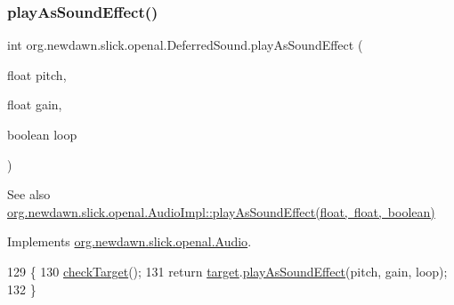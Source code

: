 \subsubsection{\texorpdfstring{play\+As\+Sound\+Effect()}{playAsSoundEffect()}\hspace{0.1cm}{\footnotesize\ttfamily [1/2]}}
{\footnotesize\ttfamily int org.\+newdawn.\+slick.\+openal.\+Deferred\+Sound.\+play\+As\+Sound\+Effect (\begin{DoxyParamCaption}\item[{float}]{pitch,  }\item[{float}]{gain,  }\item[{boolean}]{loop }\end{DoxyParamCaption})\hspace{0.3cm}{\ttfamily [inline]}}

\begin{DoxySeeAlso}{See also}
\mbox{\hyperlink{classorg_1_1newdawn_1_1slick_1_1openal_1_1_audio_impl_a731e0f7331c13b1c6507303ab875c6da}{org.\+newdawn.\+slick.\+openal.\+Audio\+Impl\+::play\+As\+Sound\+Effect(float, float, boolean)}} 
\end{DoxySeeAlso}


Implements \mbox{\hyperlink{interfaceorg_1_1newdawn_1_1slick_1_1openal_1_1_audio_a69c3621a4a4bcbe9f1711f569c54017b}{org.\+newdawn.\+slick.\+openal.\+Audio}}.


\begin{DoxyCode}
129                                                                         \{
130         \mbox{\hyperlink{classorg_1_1newdawn_1_1slick_1_1openal_1_1_deferred_sound_a63fc1a65a177fcaeb93ba0a071c10086}{checkTarget}}();
131         \textcolor{keywordflow}{return} \mbox{\hyperlink{classorg_1_1newdawn_1_1slick_1_1openal_1_1_deferred_sound_ab156655c2d91c0a6bbec8bd4438ac875}{target}}.\mbox{\hyperlink{interfaceorg_1_1newdawn_1_1slick_1_1openal_1_1_audio_a69c3621a4a4bcbe9f1711f569c54017b}{playAsSoundEffect}}(pitch, gain, loop);
132     \}
\end{DoxyCode}
\mbox{\label{classorg_1_1newdawn_1_1slick_1_1openal_1_1_deferred_sound_ae3a58c7d18fdd5d5444351631977eb8f}} 
